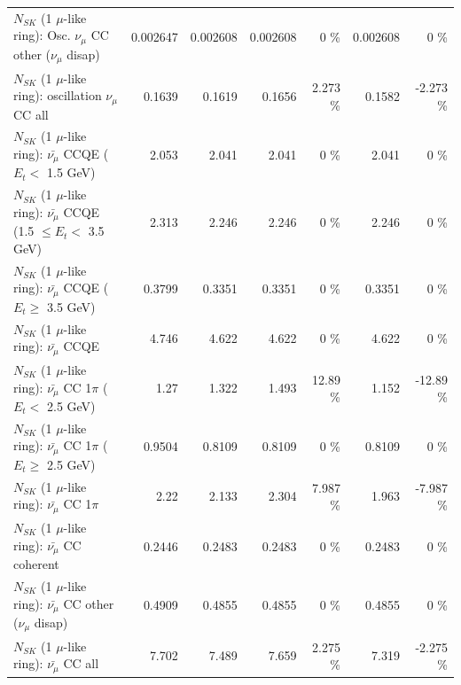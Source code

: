 \begin{table}
\begin{tabular}{| l | r | r | r  r | r  r |}
         $N_{SK}$ (1 $\mu$-like ring): Osc. $\nu_\mu$ CC other ($\nu_\mu$ disap) &        0.002647 &        0.002608 &        0.002608 &        0 \%  &        0.002608 &        0 \%  \\ 
                      $N_{SK}$ (1 $\mu$-like ring): oscillation $\nu_\mu$ CC all &          0.1639 &          0.1619 &          0.1656 &    2.273 \%  &          0.1582 &   -2.273 \%  \\ 
\hline
\hline
          $N_{SK}$ (1 $\mu$-like ring): $\bar{\nu_\mu}$ CCQE ($E_{t} <$ 1.5 GeV) &           2.053 &           2.041 &           2.041 &        0 \%  &           2.041 &        0 \%  \\ 
 $N_{SK}$ (1 $\mu$-like ring): $\bar{\nu_\mu}$ CCQE (1.5 $\leq E_{t} <$ 3.5 GeV) &           2.313 &           2.246 &           2.246 &        0 \%  &           2.246 &        0 \%  \\ 
       $N_{SK}$ (1 $\mu$-like ring): $\bar{\nu_\mu}$ CCQE ($E_{t} \geq$ 3.5 GeV) &          0.3799 &          0.3351 &          0.3351 &        0 \%  &          0.3351 &        0 \%  \\ 
\hline
                              $N_{SK}$ (1 $\mu$-like ring): $\bar{\nu_\mu}$ CCQE &           4.746 &           4.622 &           4.622 &        0 \%  &           4.622 &        0 \%  \\ 
\hline
     $N_{SK}$ (1 $\mu$-like ring): $\bar{\nu_\mu}$ CC 1$\pi$ ($E_{t} <$ 2.5 GeV) &            1.27 &           1.322 &           1.493 &    12.89 \%  &           1.152 &   -12.89 \%  \\ 
  $N_{SK}$ (1 $\mu$-like ring): $\bar{\nu_\mu}$ CC 1$\pi$ ($E_{t} \geq$ 2.5 GeV) &          0.9504 &          0.8109 &          0.8109 &        0 \%  &          0.8109 &        0 \%  \\ 
\hline
                         $N_{SK}$ (1 $\mu$-like ring): $\bar{\nu_\mu}$ CC 1$\pi$ &            2.22 &           2.133 &           2.304 &    7.987 \%  &           1.963 &   -7.987 \%  \\ 
                       $N_{SK}$ (1 $\mu$-like ring): $\bar{\nu_\mu}$ CC coherent &          0.2446 &          0.2483 &          0.2483 &        0 \%  &          0.2483 &        0 \%  \\ 
        $N_{SK}$ (1 $\mu$-like ring): $\bar{\nu_\mu}$ CC other ($\nu_\mu$ disap) &          0.4909 &          0.4855 &          0.4855 &        0 \%  &          0.4855 &        0 \%  \\ 
                          $N_{SK}$ (1 $\mu$-like ring): $\bar{\nu_{\mu}}$ CC all &           7.702 &           7.489 &           7.659 &    2.275 \%  &           7.319 &   -2.275 \%  \\ 

\end{tabular}
\end{table}

